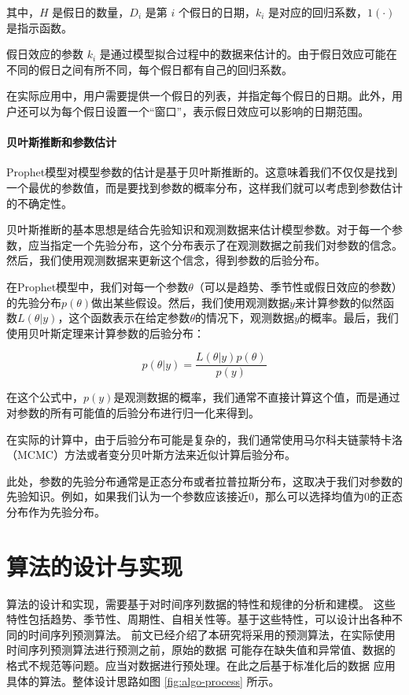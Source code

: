 \documentclass[a4paper,AutoFakeBold,oneside,12pt]{book}
\begin{document}
其中，$H$ 是假日的数量，$D_i$ 是第 $i$ 个假日的日期，$k_i$ 是对应的回归系数，$1(·)$ 是指示函数。

假日效应的参数 $k_i$ 是通过模型拟合过程中的数据来估计的。由于假日效应可能在不同的假日之间有所不同，每个假日都有自己的回归系数。

在实际应用中，用户需要提供一个假日的列表，并指定每个假日的日期。此外，用户还可以为每个假日设置一个“窗口”，表示假日效应可以影响的日期范围。

\subsubsection{贝叶斯推断和参数估计}

Prophet模型对模型参数的估计是基于贝叶斯推断的。这意味着我们不仅仅是找到一个最优的参数值，而是要找到参数的概率分布，这样我们就可以考虑到参数估计的不确定性。

贝叶斯推断的基本思想是结合先验知识和观测数据来估计模型参数。对于每一个参数，应当指定一个先验分布，这个分布表示了在观测数据之前我们对参数的信念。然后，我们使用观测数据来更新这个信念，得到参数的后验分布。

在Prophet模型中，我们对每一个参数$\theta$（可以是趋势、季节性或假日效应的参数）的先验分布$p(\theta)$做出某些假设。然后，我们使用观测数据$y$来计算参数的似然函数$L(\theta | y)$，这个函数表示在给定参数$\theta$的情况下，观测数据$y$的概率。最后，我们使用贝叶斯定理来计算参数的后验分布：

\begin{equation}
p(\theta | y) = \frac{L(\theta | y) p(\theta)}{p(y)}
\end{equation}

在这个公式中，$p(y)$是观测数据的概率，我们通常不直接计算这个值，而是通过对参数的所有可能值的后验分布进行归一化来得到。

在实际的计算中，由于后验分布可能是复杂的，我们通常使用马尔科夫链蒙特卡洛（MCMC）方法\cite{10.2307/23059158}或者变分贝叶斯方法\cite{tran2021practical}来近似计算后验分布。

此处，参数的先验分布通常是正态分布或者拉普拉斯分布，这取决于我们对参数的先验知识。例如，如果我们认为一个参数应该接近0，那么可以选择均值为0的正态分布作为先验分布。


\chapter{算法的设计与实现}

算法的设计和实现，需要基于对时间序列数据的特性和规律的分析和建模。
这些特性包括趋势、季节性、周期性、自相关性等。基于这些特性，可以设计出各种不同的时间序列预测算法。
前文已经介绍了本研究将采用的预测算法，在实际使用时间序列预测算法进行预测之前，原始的数据
可能存在缺失值和异常值、数据的格式不规范等问题。应当对数据进行预处理。在此之后基于标准化后的数据
应用具体的算法。整体设计思路如图 \ref{fig:algo-process} 所示。
\end{document}
